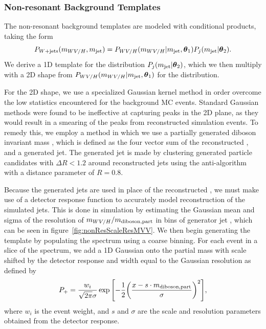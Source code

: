 \subsubsection{Non-resonant Background Templates}

The non-resonant background templates are modeled with conditional products, taking the form
\begin{equation}
  P_{W+\text{jets}}(m_{WV/H},m_\mathrm{jet})=P_{WV/H}(m_{WV/H}|m_\mathrm{jet},\vb*{\theta}_1)P_j(m_\mathrm{jet}|\vb*{\theta}_2).
\end{equation}
We derive a 1D template for the \MJ distribution $P_j(m_\mathrm{jet}|\vb*{\theta}_2)$, which we then multiply with a 2D shape from $P_{WV/H}(m_{WV/H}|m_\mathrm{jet},\vb*{\theta}_1)$ for the \MVV distribution.

For the 2D \MVV shape, we use a specialized Gaussian kernel method in order overcome the low statistics encountered for the background MC events.
Standard Gaussian methods were found to be ineffective at capturing peaks in the 2D plane, as they would result in a smearing of the peaks from reconstructed simulation events.
To remedy this, we employ a method in which we use a partially generated diboson invariant mass \MVVpart, which is defined as the four vector sum of the reconstructed \Wlep, and a generated jet.
The generated jet is made by clustering generated particle candidates with $\Delta R<1.2$ around reconstructed jets using the anti-\kt algorithm with a distance parameter of $R=0.8$.

Because the generated jets are used in place of the reconstructed \Vhad, we must make use of a detector response function to accurately model reconstruction of the simulated jets.
This is done in simulation by estimating the Gaussian mean and sigma of the resolution of $m_{WV/H}/m_\mathrm{diboson,part}$ in bins of generator jet \pt, which can be seen in figure~\ref{fig:nonResScaleResMVV}.
We then begin generating the template by populating the \MJ spectrum using a coarse binning.
For each event in a slice of the \MJ spectrum, we add a 1D Gaussian onto the partial mass with scale shifted by the detector response and width equal to the Gaussian resolution as defined by
\begin{equation}\label{eq:Pplus}
  P_+=\frac{w_i}{\sqrt{2\pi}\sigma}\exp\bqty{-\frac{1}{2}\pqty{\frac{x-s\cdot\MVVpart}{\sigma}}^2},
\end{equation}
where $w_i$ is the event weight, and $s$ and $\sigma$ are the scale and resolution parameters obtained from the detector response.


